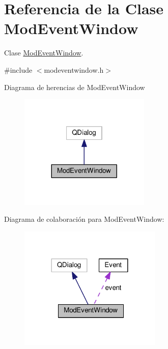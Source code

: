 \hypertarget{class_mod_event_window}{}\section{Referencia de la Clase Mod\+Event\+Window}
\label{class_mod_event_window}


Clase \hyperlink{class_mod_event_window}{Mod\+Event\+Window}.  




{\ttfamily \#include $<$modeventwindow.\+h$>$}



Diagrama de herencias de Mod\+Event\+Window\nopagebreak
\begin{figure}[H]
\begin{center}
\leavevmode
\includegraphics[width=176pt]{class_mod_event_window__inherit__graph}
\end{center}
\end{figure}


Diagrama de colaboración para Mod\+Event\+Window\+:\nopagebreak
\begin{figure}[H]
\begin{center}
\leavevmode
\includegraphics[width=192pt]{class_mod_event_window__coll__graph}
\end{center}
\end{figure}
